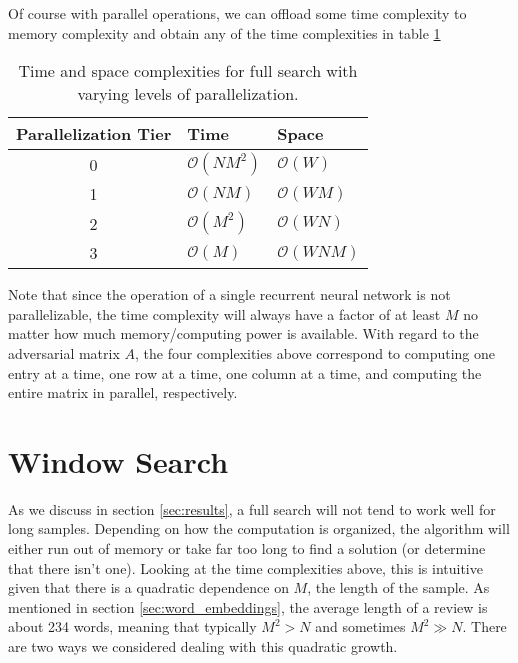 Of course with parallel operations, we can offload some time complexity to memory complexity and obtain any of the time complexities in table \ref{tab:fs_complexity}
\begin{table}
\centering
\begin{tabular}{ |c|l|l| } 
 \hline
 Parallelization Tier & Time & Space \\ \hline
 0&$\mathcal{O}(NM^2)$ & $\mathcal{O}(W)$ \\ %
 1&$\mathcal{O}(NM)$ & $\mathcal{O}(WM)$ \\ %
 2&$\mathcal{O}(M^2)$ & $\mathcal{O}(WN)$ \\ %
 3&$\mathcal{O}(M)$ & $\mathcal{O}(WNM)$ \\ \hline
\end{tabular}
\caption{Time and space complexities for full search with varying levels of parallelization.}
\label{tab:fs_complexity}
\end{table}
Note that since the operation of a single recurrent neural network is not parallelizable, the time complexity will always have a factor of at least $M$ no matter how much memory/computing power is available.  With regard to the adversarial matrix $A$, the four complexities above correspond to computing one entry at a time, one row at a time, one column at a time, and computing the entire matrix in parallel, respectively.  

\section{Window Search}
As we discuss in section \ref{sec:results}, a full search will not tend to work well for long samples.  Depending on how the computation is organized, the algorithm will either run out of memory or take far too long to find a solution (or determine that there isn't one).  Looking at the time complexities above, this is intuitive given that there is a quadratic dependence on $M$, the length of the sample.  As mentioned in section \ref{sec:word_embeddings}, the average length of a review is about 234 words, meaning that typically $M^2 > N$ and sometimes $M^2 \gg N$.  There are two ways we considered dealing with this quadratic growth.


